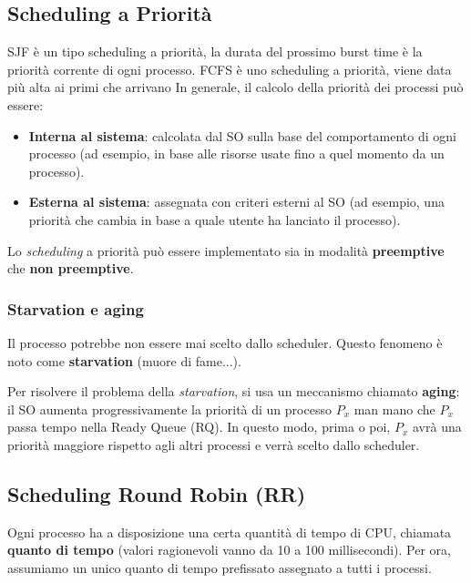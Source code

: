 \subsection{Scheduling a Priorità}
SJF è un tipo scheduling a priorità, la durata del prossimo burst time è la priorità corrente di ogni processo.
FCFS è uno scheduling a priorità, viene data più alta ai primi che arrivano
In generale, il calcolo della priorità dei processi può essere:
\begin{itemize}
    \item \textbf{Interna al sistema}: calcolata dal SO sulla base del comportamento di ogni processo (ad esempio, in base alle risorse usate fino a quel momento da un processo).
    \item \textbf{Esterna al sistema}: assegnata con criteri esterni al SO (ad esempio, una priorità che cambia in base a quale utente ha lanciato il processo).
\end{itemize}

Lo \textit{scheduling} a priorità può essere implementato sia in modalità \textbf{preemptive} che \textbf{non preemptive}.

\subsubsection{Starvation e aging}
Il processo potrebbe non essere mai scelto dallo scheduler. Questo fenomeno è noto come \textbf{starvation} (muore di fame...). 

Per risolvere il problema della \textit{starvation}, si usa un meccanismo chiamato \textbf{aging}: il SO aumenta progressivamente la priorità di un processo $P_x$ man mano che $P_x$ passa tempo nella Ready Queue (RQ). In questo modo, prima o poi, $P_x$ avrà una priorità maggiore rispetto agli altri processi e verrà scelto dallo scheduler.


\subsection{Scheduling Round Robin (RR)}
Ogni processo ha a disposizione una certa quantità di tempo di CPU, chiamata \textbf{quanto di tempo} (valori ragionevoli vanno da 10 a 100 millisecondi). Per ora, assumiamo un unico quanto di tempo prefissato assegnato a tutti i processi. 

